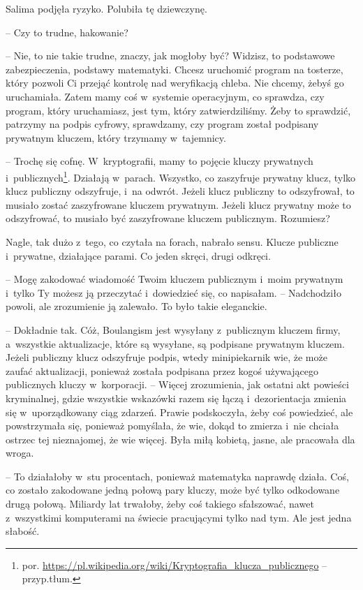 \documentclass[oneside,polish,11pt,sfheadings]{mwbk}
\begin{document}
Salima podjęła ryzyko. Polubiła tę dziewczynę. 

-- Czy to trudne,
hakowanie?

-- Nie, to nie takie trudne, znaczy, jak mogłoby być? Widzisz, to
podstawowe zabezpieczenia, podstawy matematyki. Chcesz uruchomić program
na tosterze, który pozwoli Ci przejąć kontrolę nad weryfikacją chleba.
Nie chcemy, żebyś go uruchamiała. Zatem mamy coś w~systemie operacyjnym,
co sprawdza, czy program, który uruchamiasz, jest tym, który
zatwierdziliśmy. Żeby to sprawdzić, patrzymy na podpis cyfrowy,
sprawdzamy, czy program został podpisany prywatnym kluczem, który
trzymamy w~tajemnicy.

-- Trochę się cofnę. W~kryptografii, mamy to pojęcie kluczy prywatnych i~publicznych\footnote{ por.
\url{https://pl.wikipedia.org/wiki/Kryptografia\_klucza\_publicznego} -- przyp.tłum.}. Działają w~parach. Wszystko, co zaszyfruje prywatny
klucz, tylko klucz publiczny odszyfruje, i~na odwrót. Jeżeli klucz
publiczny to odszyfrował, to musiało zostać zaszyfrowane kluczem
prywatnym. Jeżeli klucz prywatny może to odszyfrować, to musiało być
zaszyfrowane kluczem publicznym. Rozumiesz?

Nagle, tak dużo z~tego, co czytała na forach, nabrało sensu. Klucze
publiczne i~prywatne, działające parami. Co jeden skręci, drugi odkręci.

-- Mogę zakodować wiadomość Twoim kluczem publicznym i~moim prywatnym i~tylko Ty możesz ją przeczytać i~dowiedzieć się, co napisałam. -- Nadchodziło powoli, ale zrozumienie ją zalewało. To było takie
eleganckie.

-- Dokładnie tak. Cóż, Boulangism jest wysyłany z~publicznym kluczem
firmy, a~wszystkie aktualizacje, które są wysyłane, są podpisane
prywatnym kluczem. Jeżeli publiczny klucz odszyfruje podpis, wtedy
minipiekarnik wie, że może zaufać aktualizacji, ponieważ została
podpisana przez kogoś używającego publicznych kluczy w~korporacji. -- Więcej zrozumienia, jak ostatni akt powieści kryminalnej, gdzie
wszystkie wskazówki razem się łączą i~dezorientacja zmienia się w~uporządkowany ciąg zdarzeń. Prawie podskoczyła, żeby coś powiedzieć, ale
powstrzymała się, ponieważ pomyślała, że wie, dokąd to zmierza i~nie
chciała ostrzec tej nieznajomej, że wie więcej. Była miłą kobietą,
jasne, ale pracowała dla wroga.

-- To działałoby w~stu procentach, ponieważ matematyka naprawdę działa.
Coś, co zostało zakodowane jedną połową pary kluczy, może być tylko
odkodowane drugą połową. Miliardy lat trwałoby, żeby coś takiego
sfałszować, nawet z~wszystkimi komputerami na świecie pracującymi tylko
nad tym. Ale jest jedna słabość.
\end{document}
